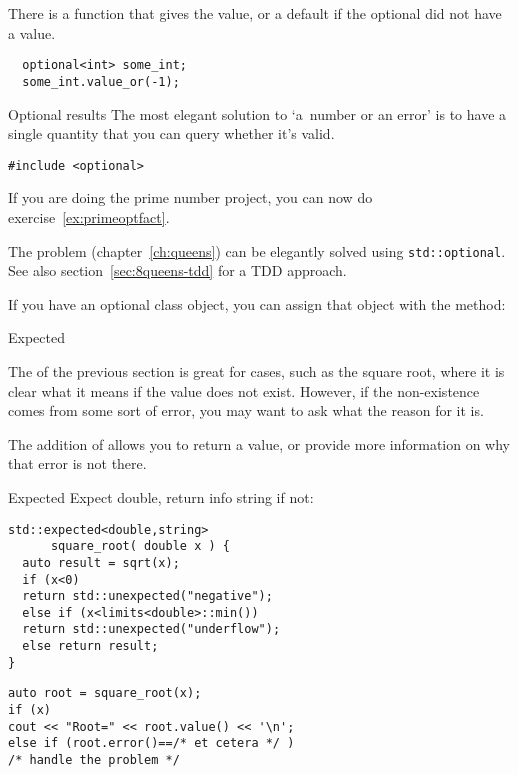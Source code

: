 There is a function  that gives the value, or
a default if the optional did not have a value.
\begin{lstlisting}
  optional<int> some_int;
  some_int.value_or(-1);
\end{lstlisting}

\begin{slide}{Optional results}
  \label{sl:optional-root}
  The most elegant solution to `a~number or an error' is to have a
  single quantity that you can query whether it's valid.
\begin{lstlisting}
#include <optional>
\end{lstlisting}
  \lstset{numbers=left,numberstyle=\tiny}
\end{slide}

\begin{nopackt}
\begin{exercise}
    If you are doing the prime number project,
    you can now do exercise~\ref{ex:primeoptfact}.
\end{exercise}
\end{nopackt}

\begin{exercise}
  The  problem (chapter~\ref{ch:queens})
  can be elegantly solved using \lstinline+std::optional+.
  See also section~\ref{sec:8queens-tdd} for a \ac{TDD} approach.
\end{exercise}

\begin{remark}
  If you have an optional class object, you can assign that object
  with the  method:
\end{remark}

 {Expected}

The  of the previous section is great
for cases, such as the square root, where it is clear
what it means if the value does not exist.
However, if the non-existence comes from some sort of error,
you may want to ask what the reason for it is.

The  addition of 
allows you to return a value, or provide more information
on why that error is not there.
\begin{block}{Expected}
\label{sl:expected}
Expect double, return info string if not:
\begin{multicols}{2}
\begin{lstlisting}
std::expected<double,string> 
      square_root( double x ) {
  auto result = sqrt(x);
  if (x<0)
  return std::unexpected("negative");
  else if (x<limits<double>::min())
  return std::unexpected("underflow");
  else return result;
}
\end{lstlisting}
\columnbreak
\begin{lstlisting}
auto root = square_root(x);
if (x)
cout << "Root=" << root.value() << '\n';
else if (root.error()==/* et cetera */ )
/* handle the problem */
\end{lstlisting}
\end{multicols}
\end{block}

